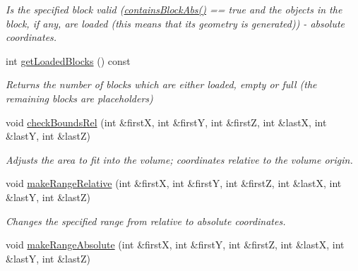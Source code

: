 \begin{DoxyCompactItemize}
\begin{DoxyCompactList}\small\item\em \-Is the specified block valid (\hyperlink{classVoxelVolume_adce4bd2b9ef0868e0c9b1ffdb2d7b189}{contains\-Block\-Abs()} == true and the objects in the block, if any, are loaded (this means that its geometry is generated)) -\/ absolute coordinates. \end{DoxyCompactList}\item 
\hypertarget{classVoxelVolume_ab5c746307c6a49866c2c96c0ac4551d0}{
int \hyperlink{classVoxelVolume_ab5c746307c6a49866c2c96c0ac4551d0}{get\-Loaded\-Blocks} () const }
\label{d0/d1c/classVoxelVolume_ab5c746307c6a49866c2c96c0ac4551d0}

\begin{DoxyCompactList}\small\item\em \-Returns the number of blocks which are either loaded, empty or full (the remaining blocks are placeholders) \end{DoxyCompactList}\item 
\hypertarget{classVoxelVolume_a2fbd5e22285b0ab8bf783f9e6d078c28}{
void \hyperlink{classVoxelVolume_a2fbd5e22285b0ab8bf783f9e6d078c28}{check\-Bounds\-Rel} (int \&first\-X, int \&first\-Y, int \&first\-Z, int \&last\-X, int \&last\-Y, int \&last\-Z)}
\label{d0/d1c/classVoxelVolume_a2fbd5e22285b0ab8bf783f9e6d078c28}

\begin{DoxyCompactList}\small\item\em \-Adjusts the area to fit into the volume; coordinates relative to the volume origin. \end{DoxyCompactList}\item 
\hypertarget{classVoxelVolume_ad1e6366621073b437801621894d4e624}{
void \hyperlink{classVoxelVolume_ad1e6366621073b437801621894d4e624}{make\-Range\-Relative} (int \&first\-X, int \&first\-Y, int \&first\-Z, int \&last\-X, int \&last\-Y, int \&last\-Z)}
\label{d0/d1c/classVoxelVolume_ad1e6366621073b437801621894d4e624}

\begin{DoxyCompactList}\small\item\em \-Changes the specified range from relative to absolute coordinates. \end{DoxyCompactList}\item 
\hypertarget{classVoxelVolume_a862d840e230107fbb14e7942a82650f8}{
void \hyperlink{classVoxelVolume_a862d840e230107fbb14e7942a82650f8}{make\-Range\-Absolute} (int \&first\-X, int \&first\-Y, int \&first\-Z, int \&last\-X, int \&last\-Y, int \&last\-Z)}
\label{d0/d1c/classVoxelVolume_a862d840e230107fbb14e7942a82650f8}


\end{DoxyCompactItemize}
